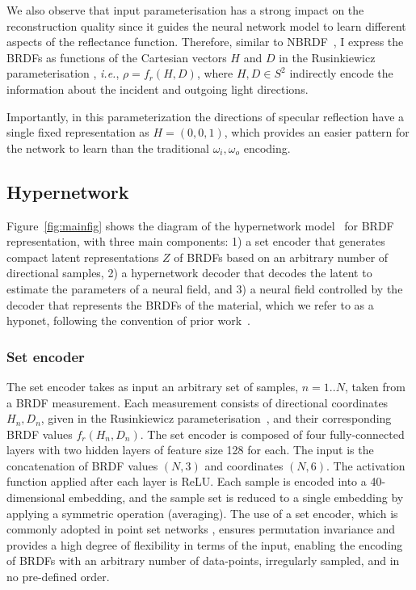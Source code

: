 We also observe that input parameterisation has a strong impact on the reconstruction quality since it guides the neural network model to learn different aspects of the reflectance function. Therefore, similar to NBRDF~\cite{sztrajman2021neural}, I express the \gls{BRDF}s as functions of the Cartesian vectors $H$ and $D$ in the Rusinkiewicz parameterisation \cite{rusinkiewicz1998new},
\textit{i.e.}, $\rho=f_r(H, D)$, where $H, D \in S^2$ indirectly encode the information about the incident and outgoing light directions.

Importantly, in this parameterization the directions of specular reflection have a single fixed representation as $H=(0,0,1)$, which provides an easier pattern for the network to learn than the traditional $\omega_i, \omega_o$ encoding.


\subsection{Hypernetwork}
\label{sec:hypernet}

Figure~\ref{fig:mainfig} shows the diagram of the hypernetwork model~\cite{sitzmann2020siren} for \gls{BRDF} representation, with three main components: 1) a set encoder that generates compact latent representations $Z$ of \gls{BRDF}s based on an arbitrary number of directional samples, 2) a hypernetwork decoder that decodes the latent to estimate the parameters of a neural field,
and 3) a neural field controlled by the decoder that represents the \gls{BRDF}s of the material, which we refer to as a hyponet, following the convention of prior work~\cite{sitzmann2020metasdf}.


\subsubsection{Set encoder} %

The set encoder takes as input an arbitrary set of samples, $n=1..N$, taken from a \gls{BRDF} measurement. Each measurement consists of directional coordinates ${H_n, D_n}$, given in the Rusinkiewicz parameterisation~\cite{rusinkiewicz1998new}, and their corresponding \gls{BRDF} values $f_r(H_n,D_n)$. The set encoder is composed of four fully-connected layers with two hidden layers of feature size 128 for each. The input is the concatenation of \gls{BRDF} values $(N, 3)$ and coordinates $(N, 6)$. The activation function applied after each layer is \gls{ReLU}. Each sample is encoded into a 40-dimensional embedding, and the sample set is reduced to a single embedding by applying a symmetric operation (averaging).
The use of a set encoder, which is commonly adopted in point set networks \cite{zaheer2017deepsets}, ensures permutation invariance and provides a high degree of flexibility in terms of the input, enabling the encoding of \gls{BRDF}s with an arbitrary number of data-points, irregularly sampled, and in no pre-defined order.



